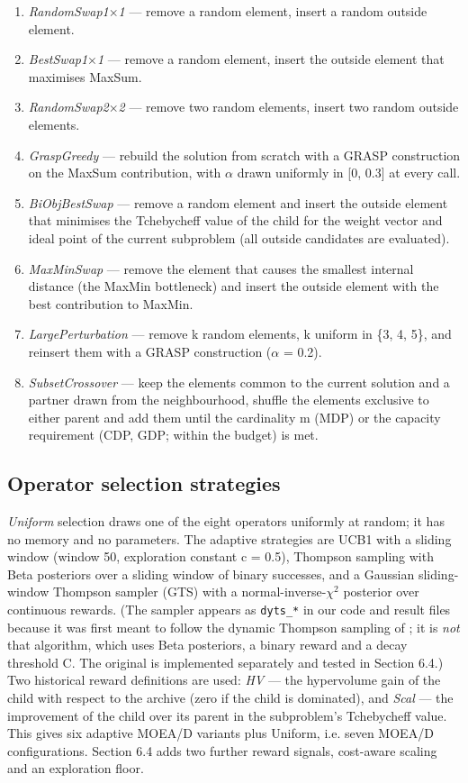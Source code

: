 \begin{enumerate}
\item \emph{RandomSwap1$\times$1} --- remove a random element, insert a random outside element.
\item \emph{BestSwap1$\times$1} --- remove a random element, insert the outside element that maximises MaxSum.
\item \emph{RandomSwap2$\times$2} --- remove two random elements, insert two random outside elements.
\item \emph{GraspGreedy} --- rebuild the solution from scratch with a GRASP construction on the MaxSum contribution, with $\alpha$ drawn uniformly in [0, 0.3] at every call.
\item \emph{BiObjBestSwap} --- remove a random element and insert the outside element that minimises the Tchebycheff value of the child for the weight vector and ideal point of the current subproblem (all outside candidates are evaluated).
\item \emph{MaxMinSwap} --- remove the element that causes the smallest internal distance (the MaxMin bottleneck) and insert the outside element with the best contribution to MaxMin.
\item \emph{LargePerturbation} --- remove k random elements, k uniform in \{3, 4, 5\}, and reinsert them with a GRASP construction ($\alpha$ = 0.2).
\item \emph{SubsetCrossover} --- keep the elements common to the current solution and a partner drawn from the neighbourhood, shuffle the elements exclusive to either parent and add them until the cardinality m (MDP) or the capacity requirement (CDP, GDP; within the budget) is met.
\end{enumerate}

\subsection{Operator selection strategies}\label{sec:operator_selection_strategie}

\emph{Uniform} selection draws one of the eight operators uniformly at random; it has no memory and no parameters. The adaptive strategies are UCB1 \citep{auer2002} with a sliding window (window 50, exploration constant c = 0.5), Thompson sampling \citep{thompson1933} with Beta posteriors over a sliding window of binary successes, and a Gaussian sliding-window Thompson sampler (GTS) with a normal-inverse-$\chi$$^{2}$ posterior over continuous rewards. (The sampler appears as \texttt{dyts\_\allowbreak{}*} in our code and result files because it was first meant to follow the dynamic Thompson sampling of \citet{sun2020}; it is \emph{not} that algorithm, which uses Beta posteriors, a binary reward and a decay threshold C. The original is implemented separately and tested in Section 6.4.) Two historical reward definitions are used: \emph{HV} --- the hypervolume gain of the child with respect to the archive (zero if the child is dominated), and \emph{Scal} --- the improvement of the child over its parent in the subproblem's Tchebycheff value. This gives six adaptive MOEA/D variants plus Uniform, i.e. seven MOEA/D configurations. Section 6.4 adds two further reward signals, cost-aware scaling and an exploration floor.

